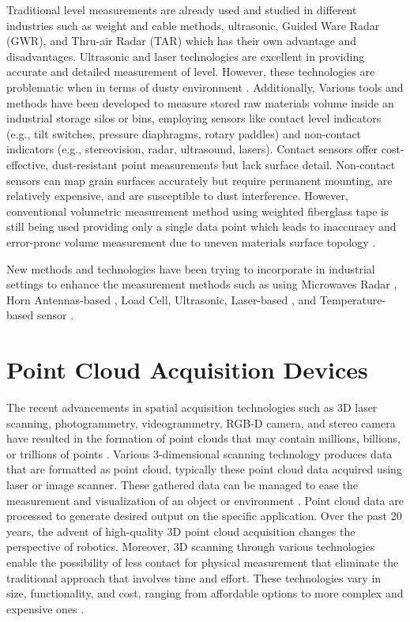 Traditional level measurements are already used and studied in different industries such as weight and cable methods, ultrasonic, Guided Ware Radar (GWR), and Thru-air Radar (TAR) which has their own advantage and disadvantages. Ultrasonic and laser technologies are excellent in providing accurate and detailed measurement of level. However, these technologies are problematic when in terms of dusty environment \citep{duysak2020}. Additionally, Various tools and methods have been developed to measure stored raw materials volume inside an industrial storage silos or bins, employing sensors like contact level indicators (e.g., tilt switches, pressure diaphragms, rotary paddles) and non-contact indicators (e.g., stereovision, radar, ultrasound, lasers). Contact sensors offer cost-effective, dust-resistant point measurements but lack surface detail. Non-contact sensors can map grain surfaces accurately but require permanent mounting, are relatively expensive, and are susceptible to dust interference. However, conventional volumetric measurement method using weighted fiberglass tape is still being used providing only a single data point which leads to inaccuracy and error-prone volume measurement due to uneven materials  surface topology \citep{turner2016,turner2017}.

New methods and technologies have been trying to incorporate in industrial settings to enhance the measurement methods such as using Microwaves Radar \citep{vogt2017}, Horn Antennas-based \citep{duysak2020, yigit2015}, Load Cell, Ultrasonic, Laser-based \citep{geuvara2020}, and Temperature-based sensor \citep{rhee2021}.

\section{Point Cloud Acquisition Devices}
\label{rrl:sec:3D Point Cloud acquisition}
The recent advancements in spatial acquisition technologies such as 3D laser scanning, photogrammetry, videogrammetry, RGB-D camera, and stereo camera have resulted in the formation of point clouds that may contain millions, billions, or trillions of points \citep{jaboyedoff2012}. Various 3-dimensional scanning technology produces data that are formatted as point cloud, typically these point cloud data acquired using laser or image scanner. These gathered data can be managed to ease the measurement and visualization of an object or environment \citep{chua2017}. Point cloud data are processed to generate desired output on the specific application. Over the past 20 years, the advent of high-quality 3D point cloud acquisition changes the perspective of robotics. Moreover, 3D scanning through various technologies enable the possibility of less contact for physical measurement that eliminate the traditional approach that involves time and effort. These technologies vary in size, functionality, and cost, ranging from affordable options to more complex and expensive ones \citep{rusu2011}.


